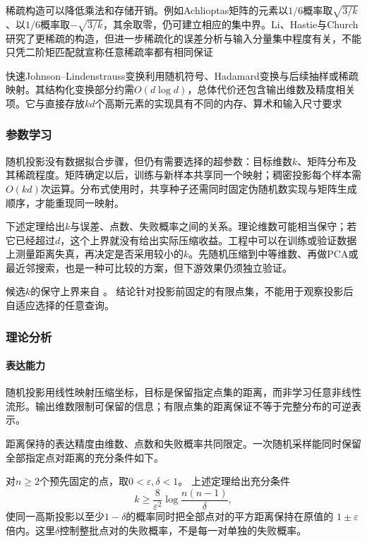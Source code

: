稀疏构造可以降低乘法和存储开销。例如Achlioptas矩阵的元素以$1/6$概率取$\sqrt{3/k}$、以$1/6$概率取$-\sqrt{3/k}$，其余取零，仍可建立相应的集中界。Li、Hastie与Church研究了更稀疏的构造，但进一步稀疏化的误差分析与输入分量集中程度有关，不能只凭二阶矩匹配就宣称任意稀疏率都有相同保证

快速Johnson--Lindenstrauss变换利用随机符号、Hadamard变换与后续抽样或稀疏映射。其结构化变换部分约需$O(d\log d)$，总体代价还包含输出维数及精度相关项。它与直接存放$kd$个高斯元素的实现具有不同的内存、算术和输入尺寸要求

\subsubsection{参数学习}
\label{sec:dim-rp-learning}

随机投影没有数据拟合步骤，但仍有需要选择的超参数：目标维数$k$、矩阵分布及其稀疏程度。矩阵确定以后，训练与新样本共享同一个映射；稠密投影每个样本需$O(kd)$次运算。分布式使用时，共享种子还需同时固定伪随机数实现与矩阵生成顺序，才能重现同一映射。

下述定理给出$k$与误差、点数、失败概率之间的关系。理论维数可能相当保守；若它已经超过$d$，这个上界就没有给出实际压缩收益。工程中可以在训练或验证数据上测量距离失真，再决定是否采用较小的$k$。先随机压缩到中等维数、再做PCA或最近邻搜索，也是一种可比较的方案，但下游效果仍须独立验证。

候选$k$的保守上界来自
。
结论针对投影前固定的有限点集，不能用于观察投影后自适应选择的任意查询。

\subsubsection{理论分析}
\label{sec:dim-rp-theory}

\paragraph{表达能力}
随机投影用线性映射压缩坐标，目标是保留指定点集的距离，而非学习任意非线性流形。输出维数限制可保留的信息；有限点集的距离保证不等于完整分布的可逆表示。

距离保持的表达精度由维数、点数和失败概率共同限定。一次随机采样能同时保留全部指定点对距离的充分条件如下。

对$n\geq2$个预先固定的点，取$0<\varepsilon,\delta<1$。
上述定理给出充分条件
\[
  k\geq\frac{8}{\varepsilon^2}\log\frac{n(n-1)}{\delta},
\]
使同一高斯投影以至少$1-\delta$的概率同时把全部点对的平方距离保持在原值的
$1\pm\varepsilon$倍内。这里$\delta$控制整批点对的失败概率，不是每一对单独的失败概率。

